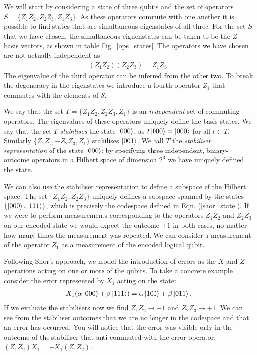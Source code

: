 We will start by considering a state of three qubits and the set of operators $S = \{Z_1Z_2, Z_2Z_3, Z_1Z_3\}$. As these operators commute with one another it is possible to find states that are simultaneous eigenstates of all three. For the set $S$ that we have chosen, the simultaneous eignenstates can be taken to be the $Z$ basis vectors, as shown in table Fig.~\ref{ops_states}. The operators we have chosen are not actually independent as
\begin{align}
  (Z_1Z_2)(Z_2Z_3) = Z_1Z_3.
\end{align}
The eigenvalue of the third operator can be inferred from the other two. To break the degeneracy in the eigenstates we introduce a fourth operator $Z_1$ that commutes with the elements of $S$.

We say that the set $T = \{Z_1Z_2, Z_2Z_3, Z_1\}$ is an \textit{independent} set of commuting operators. The eigenvalues of these operators uniquely define the basis states. We say that the set $T$ \textit{stabilises} the state $\left\vert000\right\rangle$, as $t\left\vert000\right\rangle = \left\vert000\right\rangle$ for all $t\in T$. Similarly $\{Z_1Z_2, -Z_2Z_3, Z_1\}$ stabilises $\left\vert001\right\rangle$. We call $T$ the \textit{stabiliser representation} of the state $\left\vert000\right\rangle$; by specifying three independent, binary-outcome operators in a Hilbert space of dimension $2^3$ we have uniquely defined the state.

We can also use the stabiliser representation to define a subspace of the Hilbert space. The set $\{Z_1Z_2, Z_2Z_3\}$ uniquely defines a subspace spanned by the states $\{\left\vert000\right\rangle, \left\vert111\right\rangle\}$, which is precisely the codespace defined in Eqn. (\ref{shor_state}). If we were to perform measurements corresponding to the operators $Z_1Z_2$ and $Z_2Z_3$ on our encoded state we would expect the outcome $+1$ in both cases, no matter how many times the measurement was repeated. We can consider a measurement of the operator $Z_1$ as a measurement of the encoded logical qubit.

Following Shor's approach, we model the introduction of errors as the $X$ and $Z$ operations acting on one or more of the qubits. To take a concrete example consider the error represented by $X_1$ acting on the state:
\begin{align}
  X_1 (\alpha\left\vert000\right\rangle + \beta\left\vert111\right\rangle) = \alpha\left\vert100\right\rangle + \beta\left\vert011\right\rangle.
\end{align}
If we evaluate the stabilisers now we find $Z_1Z_2 \rightarrow -1$ and $Z_2 Z_3 \rightarrow +1$. We can see from the stabiliser outcomes that we are no longer in the codespace and that an error has occurred. You will notice that the error was visible only in the outcome of the stabiliser that anti-commuted with the error operator: $(Z_1Z_2)X_1 = -X_1(Z_1Z_2)$.

